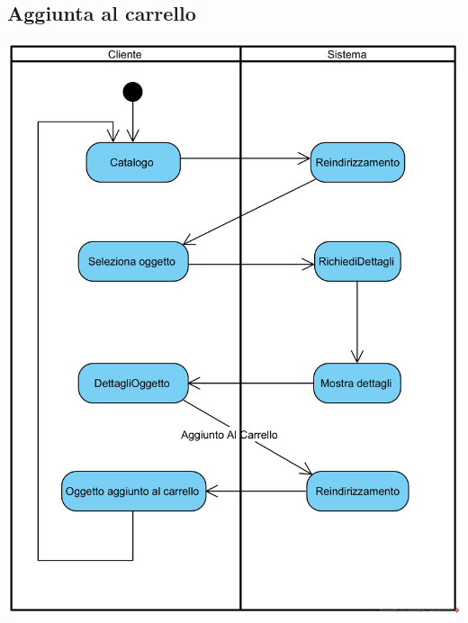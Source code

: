 \documentclass[12pt,a4paper]{article}
\begin{document}
\subsection{Aggiunta al carrello}
\begin{center}
\includegraphics[width=\textwidth]{ActivityDiagram/Carrello}
\end{center}
\end{document}
